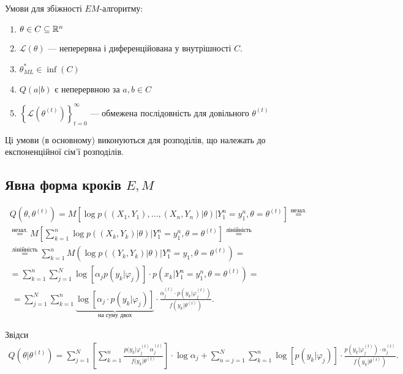 Умови для збіжності $EM$-алгоритму:
\begin{enumerate}
  \item $\theta \in  C \subseteq \mathbb{R}^{n}$ 
  \item $\mathcal{L}(\theta)$ --- неперервна і диференційована у 
    внутрішності $C$.
  \item $\theta_{ML}^{*} \in  \operatorname{inf} (C)$ 
  \item $Q(a|b)$ є неперервною за $a,b \in  C$
  \item $\left\{ \mathcal{L}\left( \theta^{(t)} \right) \right\} _{t=0}^{\infty}$ --- обмежена
    послідовність для довільного $\theta^{(t)}$
\end{enumerate}

\begin{remark}
  Ці умови (в основному) виконуються для розподілів, що належать до експоненційної
  сім'ї розподілів.
\end{remark}

\subsection{Явна форма кроків $E, M$}

\begin{align*}
  Q\left( \theta, \theta^{(t)} \right)  = M \left[ \log p\left( (X_1,Y_1),\ldots,(X_n,Y_n) | \theta \right) | Y_1^{n} = y_1^{n}, \theta = \theta^{(t)} \right] \overset{\text{незал.}}{=} \\ 
  \overset{\text{незал.}}{=} M \left[ \sum_{k=1}^{n} \log p\left( (X_k,Y_k)|\theta \right) | 
  Y_1^{n} = y_1^{n}, \theta = \theta^{(t)} \right]  \overset{\text{лінійність}}{=} \\ 
\overset{\text{лінійність}}{=} \sum_{k=1}^{n} M \left( \log p\left( (Y_k,Y_k)|\theta \right) | Y_1^{n} = y_1, \theta = \theta^{(t)} \right) = \\ 
= \sum_{k=1}^{n} \sum_{j=1}^{N} \log \left[ \alpha_j p\left( y_k|\varphi_j \right)  \right] \cdot
p\left( x_k|Y_1^{n}=y_1^{n}, \theta = \theta^{(t)} \right) = \\ \
= \sum_{j=1}^{N} \sum_{k=1}^{n} \underbrace{\log \left[ \alpha_j \cdot p(y_k|\varphi_j) \right] }_{\text{на суму двох}} \cdot \frac{\alpha_j^{(t)}\cdot p\left( y_k|\varphi_j^{(t)} \right)}{
f\left( y_k|\theta^{(t)} \right) }
.\end{align*}

Звідси 
\begin{align*}
  Q \left( \theta | \theta^{(t)} \right) = \sum_{j=1}^{N} \left[ 
    \sum_{k=1}^{n} \frac{p(y_k|\varphi_j^{(t)}\alpha_j^{(t)}}{f(y_k|\theta^{(t)}}
  \right] \cdot \log \alpha_j + \sum_{n=j=1}^{N} \sum_{k=1}^{n} \log \left[ 
  p\left( y_k | \varphi_j \right) \right] \cdot \frac{
p\left( y_k | \varphi_j^{(t)} \right) \cdot \alpha_j^{(t)}}{f\left( y_k|\theta^{(t)} \right) }
.\end{align*} 

